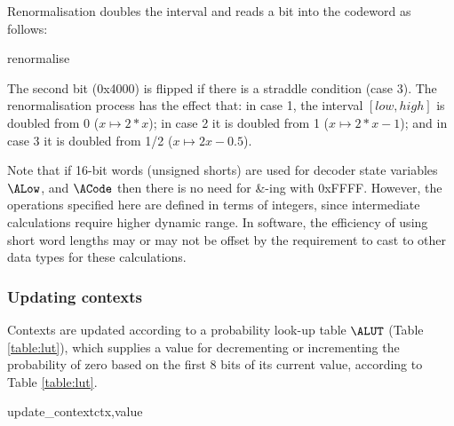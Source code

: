 Renormalisation doubles the interval and reads a bit into the codeword
as follows:

\begin{pseudo}{renormalise}{}
\bsEND
{}
\end{pseudo}

The second bit (0x4000) is flipped if there is a straddle condition (case 3). The renormalisation
process has the effect that: in case 1, the interval $[low,high]$ is doubled from 0 ($x\mapsto 2*x$); 
in case 2 it is doubled from 1 ($x\mapsto 2*x-1$); and in case 3 it is doubled from 1/2 ($x\mapsto 2x-0.5$).
 
\begin{informative}
Note that if 16-bit words (unsigned shorts) are used for decoder state variables $\ALow$,
 and $\ACode$ then there is no need for {\&}-ing with 0xFFFF. However, the 
operations specified here are defined in terms of integers, since intermediate calculations
 require higher dynamic range. In software, the efficiency of using short word lengths may
or may not be offset by the requirement to cast to other data types for these calculations.
\end{informative}

\subsubsection{Updating contexts}
\label{contextupdate}

Contexts are updated according to a probability look-up table
$\ALUT$ (Table \ref{table:lut}), which supplies a value for decrementing
or incrementing the probability of zero based on the first 
8 bits of its current value, according to Table \ref{table:lut}.

\begin{pseudo}{update\_context}{ctx,value}
\bsELSE
\bsEND
\end{pseudo}


